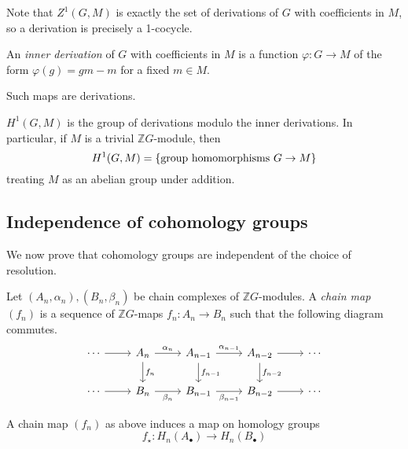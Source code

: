 Note that \( Z^1(G, M) \) is exactly the set of derivations of \( G \) with coefficients in \( M \), so a derivation is precisely a 1-cocycle.
\begin{definition}
    An \emph{inner derivation} of \( G \) with coefficients in \( M \) is a function \( \varphi : G \to M \) of the form \( \varphi(g) = gm - m \) for a fixed \( m \in M \).
\end{definition}
Such maps are derivations.
\begin{corollary}
    \( H^1(G, M) \) is the group of derivations modulo the inner derivations.
    In particular, if \( M \) is a trivial \( \mathbb Z G \)-module, then
    \[ H^1(G, M) = \qty{\text{group homomorphisms } G \to M} \]
    treating \( M \) as an abelian group under addition.
\end{corollary}

\subsection{Independence of cohomology groups}
We now prove that cohomology groups are independent of the choice of resolution.
\begin{definition}
    Let \( (A_n, \alpha_n), (B_n, \beta_n) \) be chain complexes of \( \mathbb Z G \)-modules.
    A \emph{chain map} \( (f_n) \) is a sequence of \( \mathbb Z G \)-maps \( f_n : A_n \to B_n \) such that the following diagram commutes.
\[\begin{tikzcd}
	\cdots & {A_n} & {A_{n-1}} & {A_{n-2}} & \cdots \\
	\cdots & {B_n} & {B_{n-1}} & {B_{n-2}} & \cdots
	\arrow[from=1-1, to=1-2]
	\arrow["{\alpha_n}", from=1-2, to=1-3]
	\arrow[from=2-1, to=2-2]
	\arrow["{\beta_n}"', from=2-2, to=2-3]
	\arrow["{f_n}", from=1-2, to=2-2]
	\arrow["{f_{n-1}}", from=1-3, to=2-3]
	\arrow["{\beta_{n-1}}"', from=2-3, to=2-4]
	\arrow[from=2-4, to=2-5]
	\arrow["{\alpha_{n-1}}", from=1-3, to=1-4]
	\arrow[from=1-4, to=1-5]
	\arrow["{f_{n-2}}", from=1-4, to=2-4]
\end{tikzcd}\]
\end{definition}
\begin{lemma}
    A chain map \( (f_n) \) as above induces a map on homology groups
    \[ f_\star : H_n(A_\bullet) \to H_n(B_\bullet) \]
\end{lemma}
